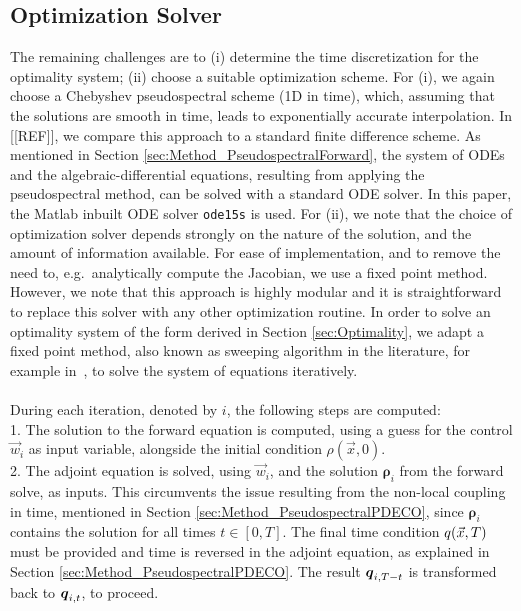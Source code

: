 \subsection{Optimization Solver}\label{sec:Method_Solver}
The remaining challenges are to (i) determine the time discretization for the optimality system;
(ii) choose a suitable optimization scheme. For (i), we again choose a Chebyshev pseudospectral scheme (1D in time), which, assuming that the solutions are smooth in time, leads to exponentially accurate interpolation. In [[REF]], we compare this approach to a standard finite difference scheme. As mentioned in Section \ref{sec:Method_PseudospectralForward}, the system of ODEs and the algebraic-differential equations, resulting from applying the pseudospectral method, can be solved with a standard ODE solver. In this paper, the Matlab inbuilt ODE solver \texttt{ode15s} is used.
For (ii), we note that the choice of optimization solver depends strongly on the nature of the solution, and the amount of information available.  For ease of implementation, and to remove the 
need to, e.g.\ analytically compute the Jacobian, we use a fixed point method. However, we note that this approach is highly modular and it is straightforward to replace this solver with any other optimization routine.
In order to solve an optimality system of the form derived in Section \ref{sec:Optimality}, we adapt a fixed point method, also known as sweeping algorithm in the literature, for example in~\cite{ACFK}, to solve the system of equations iteratively. 
\\
\\
During each iteration, denoted by $i$, the following steps are computed:\\
1. The solution to the forward equation is computed, using a guess for the control $\vec{w}_i$ as input variable, alongside the initial condition $\rho(\vec{x},0)$. \\
2. The adjoint equation is solved, using $\vec{w}_i$, and the solution $\boldsymbol\rho_i$ from the forward solve, as inputs. This circumvents the issue resulting from the non-local coupling in time, mentioned in Section \ref{sec:Method_PseudospectralPDECO}, since $\boldsymbol\rho_i$ contains the solution for all times $t \in [0,T]$. The final time condition $q(\vec{x},T)$ must be provided and time is reversed in the adjoint equation, as explained in Section \ref{sec:Method_PseudospectralPDECO}. The result $\boldsymbol {q}_{i,T-t}$ is transformed back to $\boldsymbol {q}_{i,t}$, to proceed.\\
